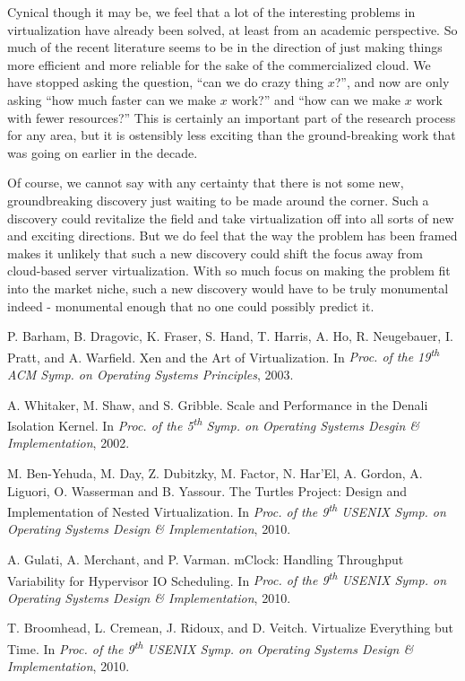 \documentclass[letterpaper, twocolumn]{article}
\begin{document}
Cynical though it may be, we feel that a lot of the interesting problems in virtualization
have already been solved, at least from an academic perspective.  So much of the recent
literature seems to be in the direction of just making things more efficient and more
reliable for the sake of the commercialized cloud.  We have stopped asking the question,
``can we do crazy thing $x$?'', and now are only asking ``how much faster can we make $x$ work?''
and ``how can we make $x$ work with fewer resources?''
This is certainly an important part of the research process for any area, but it is ostensibly
less exciting than the ground-breaking work that was going on earlier in the decade.

Of course, we cannot say with any certainty that there is not some new, groundbreaking discovery
just waiting to be made around the corner.  Such a discovery could revitalize the field
and take virtualization off into all sorts of new and exciting directions.  But we do feel that
the way the problem has been framed makes it unlikely that such a new discovery could shift
the focus away from cloud-based server virtualization.  With so much focus on making the problem
fit into the market niche, such a new discovery would have to be truly monumental indeed -
monumental enough that no one could possibly predict it.

\begin{thebibliography}{10}

{\footnotesize

	P. Barham, B. Dragovic, K. Fraser, S. Hand, T. Harris, A. Ho, R. Neugebauer,
	I. Pratt, and A. Warfield.  Xen and the Art of Virtualization.  In {\it Proc. of
	the 19\textsuperscript{th} ACM Symp. on Operating Systems Principles}, 2003.

	A. Whitaker, M. Shaw, and S. Gribble.  Scale and Performance in the Denali Isolation
	Kernel.  In {\it Proc. of the 5\textsuperscript{th} Symp. on Operating Systems
	Desgin \& Implementation}, 2002.

	M. Ben-Yehuda, M. Day, Z. Dubitzky, M. Factor, N. Har'El, A. Gordon, A. Liguori,
	O. Wasserman and B. Yassour.  The Turtles Project: Design and Implementation
	of Nested Virtualization.  In {\it Proc. of the 9\textsuperscript{th}
   USENIX Symp. on Operating Systems Design \& Implementation}, 2010.

	A. Gulati, A. Merchant, and P. Varman.  mClock: Handling Throughput Variability
	for Hypervisor IO Scheduling.  In {\it Proc. of the 9\textsuperscript{th}
   USENIX Symp. on Operating Systems Design \& Implementation}, 2010.

	T. Broomhead, L. Cremean, J. Ridoux, and D. Veitch.  Virtualize Everything but
	Time.  In {\it Proc. of the 9\textsuperscript{th}
   USENIX Symp. on Operating Systems Design \& Implementation}, 2010.

}

\end{thebibliography}
\end{document}
